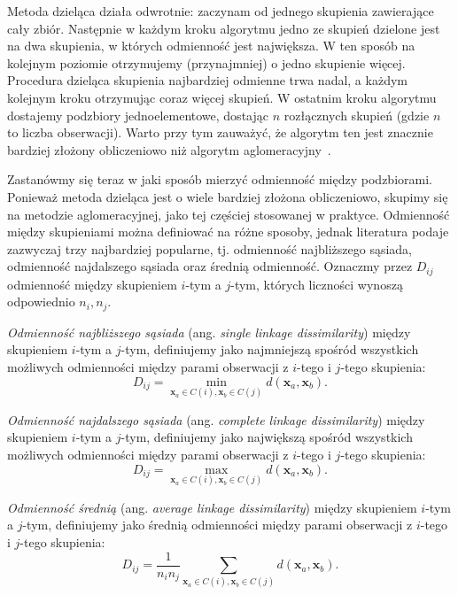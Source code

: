 \documentclass{praca1}
\begin{document}
Metoda dzieląca działa odwrotnie: zaczynam od jednego skupienia zawierające cały zbiór. Następnie w każdym kroku algorytmu jedno ze skupień dzielone jest na dwa skupienia, w których odmienność jest największa. W ten sposób na kolejnym poziomie otrzymujemy (przynajmniej) o jedno skupienie więcej. Procedura dzieląca skupienia najbardziej odmienne trwa nadal, a każdym kolejnym kroku otrzymując coraz więcej skupień. W ostatnim kroku algorytmu dostajemy podzbiory jednoelementowe, dostając $n$ rozłącznych skupień (gdzie $n$ to liczba obserwacji). Warto przy tym zauważyć, że algorytm ten jest znacznie bardziej złożony obliczeniowo niż algorytm aglomeracyjny~\cite{Hastie2009:elements, Koronacki2005:statystyczne}.

Zastanówmy się teraz w jaki sposób mierzyć odmienność między podzbiorami. Ponieważ metoda dzieląca jest o wiele bardziej złożona obliczeniowo, skupimy się na metodzie aglomeracyjnej, jako tej częściej stosowanej w praktyce. Odmienność między skupieniami można definiować na różne sposoby, jednak literatura podaje zazwyczaj trzy najbardziej popularne, tj. odmienność najbliższego sąsiada, odmienność najdalszego sąsiada oraz średnią odmienność. Oznaczmy przez $D_{ij}$ odmienność między skupieniem $i$-tym a $j$-tym, których liczności wynoszą odpowiednio $n_i, n_j$\cite{Hastie2009:elements, Koronacki2005:statystyczne}.

\begin{definition}
\emph{Odmienność najbliższego sąsiada} (ang. \emph{single linkage dissimilarity}) między skupieniem $i$-tym a $j$-tym, definiujemy jako najmniejszą spośród wszystkich możliwych odmienności między parami obserwacji z $i$-tego i $j$-tego skupienia:
$$
D_{ij} = \min\limits_{\mathbf{x}_a \in C(i), \mathbf{x}_b \in C(j)}d(\mathbf{x}_a, \mathbf{x}_b).
$$
\end{definition}

\begin{definition}
\emph{Odmienność najdalszego sąsiada} (ang. \emph{complete linkage dissimilarity}) między skupieniem $i$-tym a $j$-tym, definiujemy jako największą spośród wszystkich możliwych odmienności między parami obserwacji z $i$-tego i $j$-tego skupienia:
$$
D_{ij} = \max\limits_{\mathbf{x}_a \in C(i), \mathbf{x}_b \in C(j)}d(\mathbf{x}_a, \mathbf{x}_b).
$$
\end{definition}

\begin{definition}
\emph{Odmienność średnią} (ang. \emph{average linkage dissimilarity}) między skupieniem $i$-tym a $j$-tym, definiujemy jako średnią odmienności między parami obserwacji z $i$-tego i $j$-tego skupienia:
$$
D_{ij} = \frac{1}{n_i n_j}\sum\limits_{\mathbf{x}_a \in C(i), \mathbf{x}_b \in C(j)}d(\mathbf{x}_a, \mathbf{x}_b).
$$
\end{definition}
\end{document}
